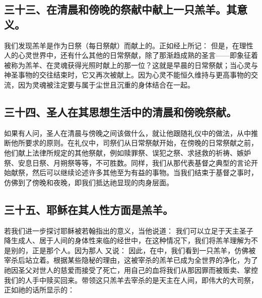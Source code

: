 
\subsection{三十三、在清晨和傍晚的祭献中献上一只羔羊。其意义。}

我们发现羔羊是作为日祭（每日祭献）而献上的。正如经上所记：  但是，在理性人的心灵世界中，还有什么其他的日常祭献，除了那渐趋成熟的圣言——即象征着被称为羔羊、在灵魂获得光照时献上的那一位？这就是早晨的日常祭献；当心灵与神圣事物的交往结束时，它又再次被献上。因为心灵不能恒久维持与更高事物的交流，因为灵魂被注定要与属于尘世且沉重的身体结合在一起。\par


\subsection{三十四、圣人在其思想生活中的清晨和傍晚祭献。}

如果有人问，圣人在清晨与傍晚之间该做什么，就让他跟随礼仪中的做法，从中推断他所要求的原则。在礼仪中，司祭们从日常祭献开始，在傍晚的日常祭献之前，他们献上法律所规定的其他祭献，例如赎罪祭、误犯之祭、求拯救的祈祷、嫉妒祭、安息日祭、月朔祭等等，不可胜数。同样，我们从那代表基督之典型的言论开始献祭，然后可以继续论述许多其他至为有益的事物。当我们结束于基督之事时，仿佛到了傍晚和夜晚，即我们抵达祂显现的肉身层面。\par


\subsection{三十五、耶稣在其人性方面是羔羊。}

若我们进一步探讨耶稣被若翰指出的意义，当他说道： 我们可以立足于天主圣子降生成人、居于人间的身体性来临的经世中，在这种情况下，我们将羔羊理解为不是别的，正是那个人。因为那人  又说：  因此，在中，我们看到一只羔羊，仿佛被宰杀后站立着。根据某些隐秘的理由，这被宰杀的羔羊已成为全世界的净化，为了祂因圣父对世人的慈爱而接受了死亡，用自己的血将我们从那因罪而被贩卖、掌控我们的人手中赎买回来。带领这只羔羊去宰杀的是天主在人间，即伟大的大司祭，正如祂的话所显示的： \par

